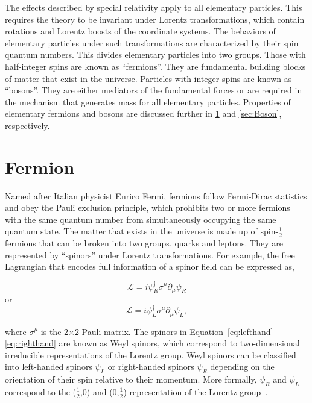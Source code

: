 The effects described by special relativity apply to all elementary particles. This requires the theory to be invariant under Lorentz transformations, which contain rotations and Lorentz boosts of the coordinate systems. The behaviors of elementary particles under such transformations are characterized by their spin quantum numbers. This divides elementary particles into two groups. Those with half-integer spins are known as ``fermions''. They are fundamental building blocks of matter that exist in the universe. Particles with integer spins are known as ``bosons''. They are either mediators of the fundamental forces or are required in the mechanism that generates mass for all elementary particles. Properties of elementary fermions and bosons are discussed further in \ref{sec:Fermion} and \autoref{sec:Boson}, respectively. 

\section{Fermion}
\label{sec:Fermion}

Named after Italian physicist Enrico Fermi, fermions follow Fermi-Dirac statistics and obey the Pauli exclusion principle, which prohibits two or more fermions with the same quantum number from simultaneously occupying the same quantum state. The matter that exists in the universe is made up of spin-$\frac{1}{2}$ fermions that can be broken into two groups, quarks and leptons. They are represented by ``spinors'' under Lorentz transformations. For example, the free Lagrangian that encodes full information of a spinor field can be expressed as,

\begin{equation}
\label{eq:lefthand}
\mathcal{L}=i\psi_{R}^{\dagger}\sigma^{\mu}\partial_{\mu}\psi_{R}
\end{equation}
or
\begin{equation}
\label{eq:righthand}
\mathcal{L}=i\psi_{L}^{\dagger}\bar{\sigma}^{\mu}\partial_{\mu}\psi_{L},
\end{equation}

where $\sigma^{\mu}$ is the 2$\times$2 Pauli matrix. The spinors in Equation~\ref{eq:lefthand}-\ref{eq:righthand} are known as Weyl spinors, which correspond to two-dimensional irreducible representations of the Lorentz group. Weyl spinors can be classified into left-handed spinors $\psi_{L}$ or right-handed spinors $\psi_{R}$ depending on the orientation of their spin relative to their momentum. More formally, $\psi_{R}$ and $\psi_{L}$ correspond to the ($\frac{1}{2}$,0) and (0,$\frac{1}{2}$) representation of the Lorentz group~\cite{zee:group}.

